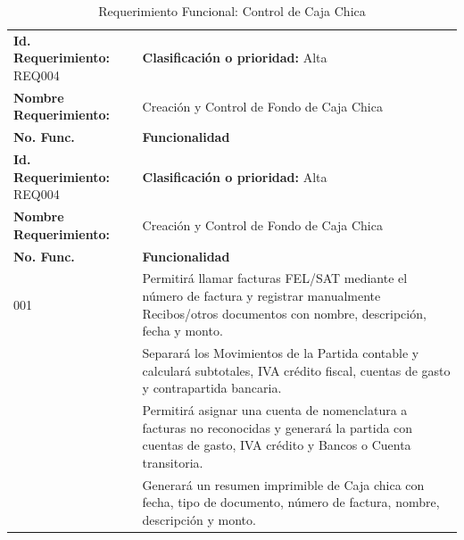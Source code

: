 {
\small
{}
\setlength{\parindent}{0pt}
\begin{xltabular}{\linewidth}{
    >{\raggedright\arraybackslash}p{4.2cm} 
    >{\raggedright\arraybackslash}X
}

    \caption{Requerimiento Funcional: Control de Caja Chica} \label{tab:req004_cajachica} \\
    \toprule
    \textbf{Id. Requerimiento:} REQ004 & \textbf{Clasificación o prioridad:} Alta \\
    \textbf{Nombre Requerimiento:} & Creación y Control de Fondo de Caja Chica \\
    \textbf{No. Func.} & \textbf{Funcionalidad} \\
    \midrule
    \endfirsthead

    \toprule
    \textbf{Id. Requerimiento:} REQ004 & \textbf{Clasificación o prioridad:} Alta \\
    \textbf{Nombre Requerimiento:} & Creación y Control de Fondo de Caja Chica \\
    \textbf{No. Func.} & \textbf{Funcionalidad} \\
    \midrule
    \endhead

    \endfoot

    \bottomrule
\endlastfoot

    001 & Permitirá llamar facturas FEL/SAT mediante el número de factura y registrar manualmente Recibos/otros documentos con nombre, descripción, fecha y monto. \\
     & Separará los Movimientos de la Partida contable y calculará subtotales, IVA crédito fiscal, cuentas de gasto y contrapartida bancaria. \\
     & Permitirá asignar una cuenta de nomenclatura a facturas no reconocidas y generará la partida con cuentas de gasto, IVA crédito y Bancos o Cuenta transitoria. \\
     & Generará un resumen imprimible de Caja chica con fecha, tipo de documento, número de factura, nombre, descripción y monto. \\
\end{xltabular}
}

